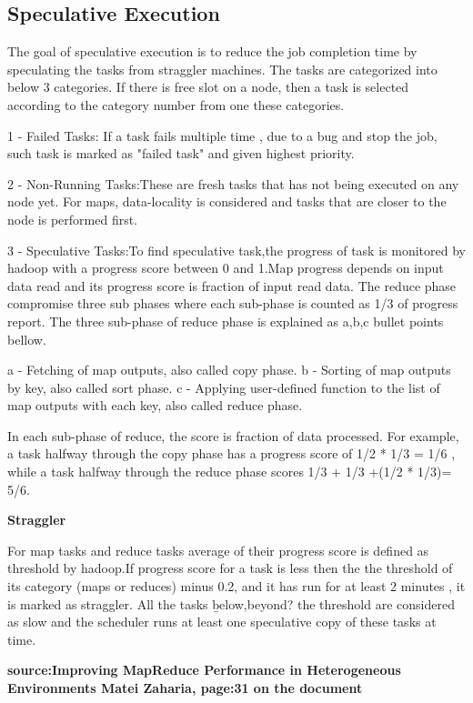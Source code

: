   
 


\subsection{Speculative Execution}

The goal of speculative execution is to reduce the job completion time by speculating the tasks from straggler machines. The tasks are categorized into below 3 categories. If there is free slot on a node, then a task is selected according to the category number from one these categories.  

1 - Failed Tasks: If a task fails multiple time , due to a bug and stop the job, such task is marked as "failed task" and given highest priority. 

2 - Non-Running Tasks:These are fresh tasks that has not being executed on any node yet. For maps, data-locality is considered and tasks that are closer to the node is performed first. 

3 - Speculative Tasks:To find speculative task,the progress of task is monitored by hadoop with a progress score between 0 and 1.Map progress depends on input data read and its progress score is fraction of input read data. The reduce phase compromise three sub phases where each sub-phase is counted as 1/3 of progress report. The three sub-phase of reduce phase is explained as a,b,c bullet points bellow. 

	a - Fetching of map outputs, also called copy phase.
	b - Sorting of map outputs by key, also called sort phase.
	c - Applying user-defined function to the list of map outputs with each key, also called reduce phase. 

In each sub-phase of reduce, the score is fraction of data processed. For example, a task halfway through the copy phase has a progress score of 1/2 * 1/3 = 1/6 , while a task halfway through the reduce phase scores 1/3 + 1/3 +(1/2 * 1/3)= 5/6.

\textbf{Straggler} 

For map tasks and reduce tasks average of their progress score is defined as threshold by hadoop.If progress score for a task is less then the the threshold of its category (maps or reduces) minus 0.2, and it has run for at least 2 minutes , it is marked as straggler. All the tasks \b{below,beyond?} the threshold are considered as slow and the scheduler runs at least one speculative copy of these tasks at time. 
 

\textbf{source:Improving MapReduce Performance in Heterogeneous Environments
Matei Zaharia, page:31 on the document}




